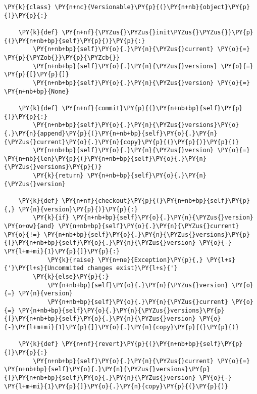 \begin{Verbatim}[commandchars=\\\{\}]
\PY{k}{class} \PY{n+nc}{Versionable}\PY{p}{(}\PY{n+nb}{object}\PY{p}{)}\PY{p}{:}

    \PY{k}{def} \PY{n+nf}{\PYZus{}\PYZus{}init\PYZus{}\PYZus{}}\PY{p}{(}\PY{n+nb+bp}{self}\PY{p}{)}\PY{p}{:}
        \PY{n+nb+bp}{self}\PY{o}{.}\PY{n}{\PYZus{}current} \PY{o}{=} \PY{p}{\PYZob{}}\PY{p}{\PYZcb{}}
        \PY{n+nb+bp}{self}\PY{o}{.}\PY{n}{\PYZus{}versions} \PY{o}{=} \PY{p}{[}\PY{p}{]}
        \PY{n+nb+bp}{self}\PY{o}{.}\PY{n}{\PYZus{}version} \PY{o}{=} \PY{n+nb+bp}{None}

    \PY{k}{def} \PY{n+nf}{commit}\PY{p}{(}\PY{n+nb+bp}{self}\PY{p}{)}\PY{p}{:}
        \PY{n+nb+bp}{self}\PY{o}{.}\PY{n}{\PYZus{}versions}\PY{o}{.}\PY{n}{append}\PY{p}{(}\PY{n+nb+bp}{self}\PY{o}{.}\PY{n}{\PYZus{}current}\PY{o}{.}\PY{n}{copy}\PY{p}{(}\PY{p}{)}\PY{p}{)}
        \PY{n+nb+bp}{self}\PY{o}{.}\PY{n}{\PYZus{}version} \PY{o}{=} \PY{n+nb}{len}\PY{p}{(}\PY{n+nb+bp}{self}\PY{o}{.}\PY{n}{\PYZus{}versions}\PY{p}{)}
        \PY{k}{return} \PY{n+nb+bp}{self}\PY{o}{.}\PY{n}{\PYZus{}version}

    \PY{k}{def} \PY{n+nf}{checkout}\PY{p}{(}\PY{n+nb+bp}{self}\PY{p}{,} \PY{n}{version}\PY{p}{)}\PY{p}{:}
        \PY{k}{if} \PY{n+nb+bp}{self}\PY{o}{.}\PY{n}{\PYZus{}version} \PY{o+ow}{and} \PY{n+nb+bp}{self}\PY{o}{.}\PY{n}{\PYZus{}current} \PY{o}{!=} \PY{n+nb+bp}{self}\PY{o}{.}\PY{n}{\PYZus{}versions}\PY{p}{[}\PY{n+nb+bp}{self}\PY{o}{.}\PY{n}{\PYZus{}version} \PY{o}{-} \PY{l+m+mi}{1}\PY{p}{]}\PY{p}{:}
            \PY{k}{raise} \PY{n+ne}{Exception}\PY{p}{,} \PY{l+s}{'}\PY{l+s}{Uncommited changes exist}\PY{l+s}{'}
        \PY{k}{else}\PY{p}{:}
            \PY{n+nb+bp}{self}\PY{o}{.}\PY{n}{\PYZus{}version} \PY{o}{=} \PY{n}{version}
            \PY{n+nb+bp}{self}\PY{o}{.}\PY{n}{\PYZus{}current} \PY{o}{=} \PY{n+nb+bp}{self}\PY{o}{.}\PY{n}{\PYZus{}versions}\PY{p}{[}\PY{n+nb+bp}{self}\PY{o}{.}\PY{n}{\PYZus{}version} \PY{o}{-}\PY{l+m+mi}{1}\PY{p}{]}\PY{o}{.}\PY{n}{copy}\PY{p}{(}\PY{p}{)}

    \PY{k}{def} \PY{n+nf}{revert}\PY{p}{(}\PY{n+nb+bp}{self}\PY{p}{)}\PY{p}{:}
        \PY{n+nb+bp}{self}\PY{o}{.}\PY{n}{\PYZus{}current} \PY{o}{=} \PY{n+nb+bp}{self}\PY{o}{.}\PY{n}{\PYZus{}versions}\PY{p}{[}\PY{n+nb+bp}{self}\PY{o}{.}\PY{n}{\PYZus{}version} \PY{o}{-} \PY{l+m+mi}{1}\PY{p}{]}\PY{o}{.}\PY{n}{copy}\PY{p}{(}\PY{p}{)}
\end{Verbatim}
